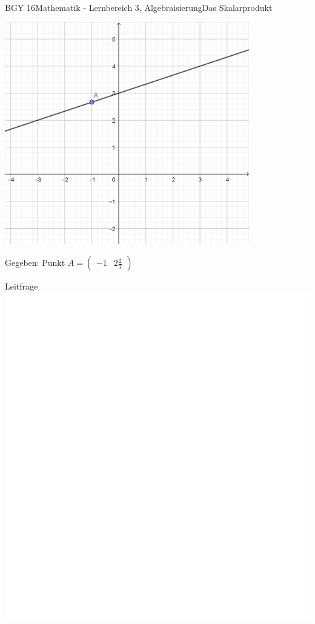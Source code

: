 \documentclass[oneside,openany,headings=optiontotoc,11pt,numbers=noenddot]{scrreprt}
\begin{document}
	\begin{worksheet}{BGY 16}{Mathematik - Lernbereich 3, Algebraisierung}{Das Skalarprodukt}
				
		\begin{framed}
			\noindent
			\begin{center}
				\includegraphics[width=0.8\textwidth]{Bilder/Gerade.jpg}\\
			\end{center}
			Gegeben: Punkt \(A = \begin{pmatrix}
			-1 & 2\frac{2}{3}
			\end{pmatrix}\)
		\end{framed}
		\begin{framed}
			\tiny{\color{codegray}Leitfrage}\\
			\includegraphics[scale=0.05]{../empty.jpg}

\end{framed}
\end{worksheet}
\end{document}
